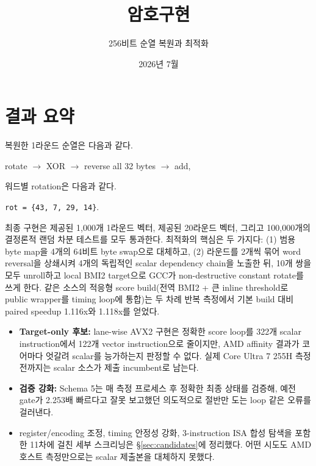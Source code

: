 \documentclass[11pt,a4paper]{article}
\title{암호구현}
\author{256비트 순열 복원과 최적화}
\date{2026년 7월}
\begin{document}
\maketitle

\section*{결과 요약}

복원한 1라운드 순열은 다음과 같다.

\begin{center}
rotate $\rightarrow$ XOR $\rightarrow$ reverse all 32 bytes $\rightarrow$ add,
\end{center}

워드별 rotation은 다음과 같다.

\begin{center}
\texttt{rot = \{43, 7, 29, 14\}}.
\end{center}

최종 구현은 제공된 1,000개 1라운드 벡터, 제공된 20라운드 벡터, 그리고
100,000개의 결정론적 랜덤 차분 테스트를 모두 통과한다.  최적화의 핵심은
두 가지다: (1) 범용 byte map을 4개의 64비트 byte swap으로 대체하고,
(2) 라운드를 2개씩 묶어 word reversal을 상쇄시켜 4개의 독립적인
scalar dependency chain을 노출한 뒤, 10개 쌍을 모두 unroll하고 local
BMI2 target으로 GCC가 non-destructive constant rotate를 쓰게 한다.
같은 소스의 적응형 score build(전역 BMI2 + 큰 inline threshold로 public
wrapper를 timing loop에 통합)는 두 차례 반복 측정에서 기본 build 대비
paired speedup 1.116x와 1.118x를 얻었다.

\begin{itemize}
  \item \textbf{Target-only 후보:} lane-wise AVX2 구현은 정확한 score
        loop를 322개 scalar instruction에서 122개 vector instruction으로
        줄이지만, AMD affinity 결과가 코어마다 엇갈려 scalar를 능가하는지
        판정할 수 없다.  실제 Core Ultra 7 255H 측정 전까지는 scalar
        소스가 제출 incumbent로 남는다.
  \item \textbf{검증 강화:} Schema 5는 매 측정 프로세스 후 정확한 최종
        상태를 검증해, 예전 gate가 2.253배 빠르다고 잘못 보고했던
        의도적으로 절반만 도는 loop 같은 오류를 걸러낸다.
  \item register/encoding 조정, timing 안정성 강화, 3-instruction ISA
        합성 탐색을 포함한 11차에 걸친 세부 스크리닝은 \S\ref{sec:candidates}에
        정리했다.  어떤 시도도 AMD 호스트 측정만으로는 scalar 제출본을
        대체하지 못했다.
\end{itemize}
\end{document}
